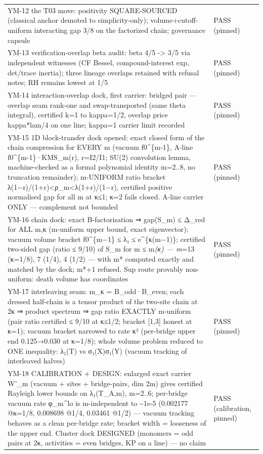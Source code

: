 \begin{longtable}[]{@{}
  >{\raggedright\arraybackslash}p{}
  >{\raggedright\arraybackslash}p{}@{}}
YM-12 the T03 move: positivity SQUARE-SOURCED (classical anchor demoted to simplicity-only); volume+cutoff-uniform interacting gap 3/8 on the factorized chain; governance capsule & PASS (pinned) \\
YM-13 verification-overlap beta audit: beta 4/5 -\textgreater{} 3/5 via independent witnesses (CF Bessel, compound-interest exp, det/trace inertia); three lineage overlaps retained with refusal notes; RH remains lowest at 1/5 & PASS (pinned) \\
YM-14 interaction-overlap dock, first carrier: bridged pair --- overlap seam rank-one and swap-transported (same theta integral), certified k=1 to kappa=1/2, overlap price kappa*lam/4 on one line; kappa=1 carrier limit recorded & PASS (pinned) \\
YM-15 1D block-transfer dock opened: exact closed form of the chain compression for EVERY m (vacuum f0\^{}\{m-1\}, A-line f0\^{}\{m-1\}·KMS\_m(r), r=I2/I1; SU(2) convolution lemma, machine-checked as a formal polynomial identity m=2..8, no truncation remainder); m-UNIFORM ratio bracket λ(1−r)/(1+r)\textless ρ\_m\textless λ(1+r)/(1−r), certified positive normalised gap for all m at κ≤1; κ=2 fails closed. A-line carrier ONLY --- complement not bounded & PASS (pinned) \\
YM-16 chain dock: exact B-factorisation ⇒ gap(S\_m) ≤ Δ\_red for ALL m,κ (m-uniform upper bound, exact eigenvector); vacuum volume bracket f0\^{}\{m−1\} ≤ λ₁ ≤ e\^{}\{κ(m−1)\}; certified two-sided gap (ratio ≤ 9/10) of S\_m for m ≤ m\emph{(κ) --- m}=13 (κ=1/8), 7 (1/4), 4 (1/2) --- with m* computed exactly and matched by the dock; m*+1 refused. Sup route provably non-uniform: death volume has coordinates & PASS (pinned) \\
YM-17 interleaving seam: m\_κ = B\_odd·B\_even; each dressed half-chain is a tensor product of the two-site chain at 2κ ⇒ product spectrum ⇒ gap ratio EXACTLY m-uniform (pair ratio certified ≤ 9/10 at κ≤1/2; bracket {[}1,3{]} honest at κ=1); vacuum bracket narrowed to rate κ² (per-bridge upper end 0.125→0.030 at κ=1/8); whole volume problem reduced to ONE inequality: λ₁(T) vs σ₁(X)σ₁(Y) (vacuum tracking of interleaved halves) & PASS (pinned) \\
YM-18 CALIBRATION + DESIGN: enlarged exact carrier W'\_m (vacuum + sites + bridge-pairs, dim 2m) gives certified Rayleigh lower bounds on λ₁(T\_A,m), m=2..6; per-bridge vacuum rate φ\_m\^{}lo is m-independent to \textasciitilde1e-5 (0.002177 @κ=1/8, 0.008698 @1/4, 0.03461 @1/2) --- vacuum tracking behaves as a clean per-bridge rate; bracket width = looseness of the upper end. Cluster dock DESIGNED (monomers = odd pairs at 2κ, activities = even bridges, KP on a line) --- no claim & PASS (calibration, pinned) \\

\end{longtable}
